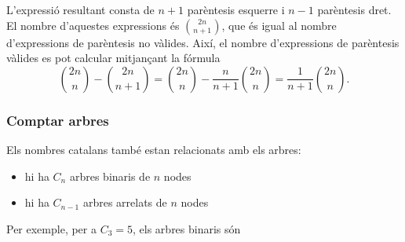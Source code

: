 L'expressió resultant consta de $n+1$ parèntesis esquerre i $n-1$
parèntesis dret. El nombre d'aquestes expressions és ${2n \choose
  n+1}$, que és igual al nombre d'expressions de parèntesis no
vàlides. Així, el nombre d'expressions de parèntesis vàlides es pot
calcular mitjançant la fórmula
\[{2n \choose n}-{2n \choose n+1} = {2n \choose n} - \frac{n}{n+1} {2n \choose n} = \frac{1}{n+1} {2n \choose n}.\]


\subsubsection{Comptar arbres}

Els nombres catalans també estan relacionats amb els arbres:

\begin{itemize}
\item hi ha $C_n$ arbres binaris de $n$ nodes
\item hi ha $C_{n-1}$ arbres arrelats de $n$ nodes
\end{itemize}
\noindent Per exemple, per a $C_3=5$, els arbres binaris són


